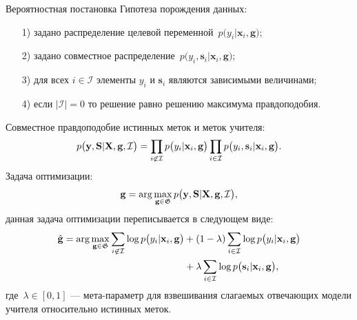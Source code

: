 \documentclass[10pt,pdf,hyperref={unicode}]{beamer}
\begin{document}
\begin{frame}{Вероятностная постановка}
\justifying
Гипотеза порождения данных:
\begin{enumerate}
	\item[1)] задано распределение целевой переменной~$p\bigr(y_i|\mathbf{x}_i, \mathbf{g}\bigr)$;
	\item[2)] задано совместное распределение~$p\bigr(y_i, \mathbf{s}_i|\mathbf{x}_i, \mathbf{g}\bigr)$;
	\item[3)] для всех $i \in \mathcal{I}$ элементы $y_i$ и $\mathbf{s}_i$ являются зависимыми величинами;
	\item[4)] если $|\mathcal{I}|=0$ то решение равно решению максимума правдоподобия.
\end{enumerate}
Совместное правдоподобие истинных меток и меток учителя:
\[
\setlength\abovedisplayskip{0pt}
p\bigr(\mathbf{y}, \mathbf{S}|\mathbf{X}, \mathbf{g}, \mathcal{I}\bigr)=\prod_{i\not\in \mathcal{I}}p\bigr(y_i|\mathbf{x}_i, \mathbf{g}\bigr)\prod_{i\in \mathcal{I}}p\bigr(y_i, \mathbf{s}_i|\mathbf{x}_i, \mathbf{g}\bigr).
\setlength\belowdisplayskip{0pt}
\]
Задача оптимизации:
\[
\setlength\abovedisplayskip{0pt}
\mathbf{g} = \arg\max_{\mathbf{g} \in \mathfrak{G}} p\bigr(\mathbf{y}, \mathbf{S}|\mathbf{X}, \mathbf{g}, \mathcal{I}\bigr),
\setlength\belowdisplayskip{0pt}
\]
данная задача оптимизации переписывается в следующем виде:
\[
\setlength\abovedisplayskip{0pt}
\begin{aligned}
\hat{\mathbf{g}} = \arg\max_{\mathbf{g}\in \mathfrak{G}} \sum_{i\not\in \mathcal{I}}\log p\bigr(y_i|\mathbf{x}_i, \mathbf{g}\bigr) &+ \left(1-\lambda\right)\sum_{i\in \mathcal{I}}\log p\bigr(y_i|\mathbf{x}_i, \mathbf{g}\bigr) \\
&+ \lambda\sum_{i\in \mathcal{I}}\log p\bigr(\mathbf{s}_i|\mathbf{x}_i, \mathbf{g}\bigr),
\end{aligned}
\setlength\belowdisplayskip{0pt}
\]
где~$\lambda \in [0,1]$ --- мета-параметр для взвешивания слагаемых отвечающих модели учителя относительно истинных меток.

\end{frame}
\end{document}
